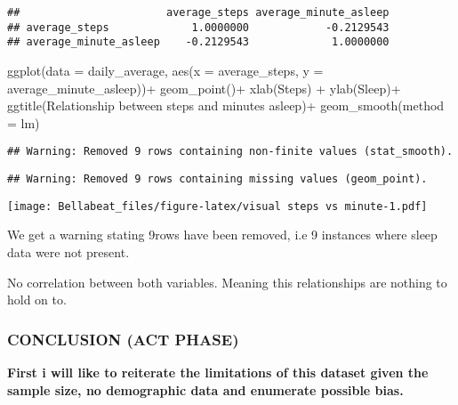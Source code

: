 \documentclass[
]{article}
\newenvironment{Shaded}{\begin{snugshade}}{\end{snugshade}}
\newcommand{\AttributeTok}[1]{\textcolor[rgb]{0.77,0.63,0.00}{#1}}
\newcommand{\FunctionTok}[1]{\textcolor[rgb]{0.00,0.00,0.00}{#1}}
\newcommand{\NormalTok}[1]{#1}
\newcommand{\SpecialCharTok}[1]{\textcolor[rgb]{0.00,0.00,0.00}{#1}}
\newcommand{\StringTok}[1]{\textcolor[rgb]{0.31,0.60,0.02}{#1}}
\begin{document}
\begin{verbatim}
##                       average_steps average_minute_asleep
## average_steps             1.0000000            -0.2129543
## average_minute_asleep    -0.2129543             1.0000000
\end{verbatim}

\begin{Shaded}
\begin{Highlighting}[]
\FunctionTok{ggplot}\NormalTok{(}\AttributeTok{data =}\NormalTok{ daily\_average, }\FunctionTok{aes}\NormalTok{(}\AttributeTok{x =}\NormalTok{ average\_steps, }\AttributeTok{y =}\NormalTok{ average\_minute\_asleep))}\SpecialCharTok{+}
  \FunctionTok{geom\_point}\NormalTok{()}\SpecialCharTok{+}
  \FunctionTok{xlab}\NormalTok{(}\StringTok{\textquotesingle{}Steps\textquotesingle{}}\NormalTok{) }\SpecialCharTok{+} \FunctionTok{ylab}\NormalTok{(}\StringTok{\textquotesingle{}Sleep\textquotesingle{}}\NormalTok{)}\SpecialCharTok{+}
  \FunctionTok{ggtitle}\NormalTok{(}\StringTok{\textquotesingle{}Relationship between steps and minutes asleep\textquotesingle{}}\NormalTok{)}\SpecialCharTok{+}
  \FunctionTok{geom\_smooth}\NormalTok{(}\AttributeTok{method =}\NormalTok{ lm)}
\end{Highlighting}
\end{Shaded}

\begin{verbatim}
## Warning: Removed 9 rows containing non-finite values (stat_smooth).
\end{verbatim}

\begin{verbatim}
## Warning: Removed 9 rows containing missing values (geom_point).
\end{verbatim}

\texttt{[image: Bellabeat\_files/figure-latex/visual steps vs minute-1.pdf]}

We get a warning stating 9rows have been removed, i.e 9 instances where
sleep data were not present.

No correlation between both variables. Meaning this relationships are
nothing to hold on to.

\hypertarget{conclusion-act-phase}{%
\subsubsection{CONCLUSION (ACT PHASE)}\label{conclusion-act-phase}}

\textbf{First i will like to reiterate the limitations of this dataset
given the sample size, no demographic data and enumerate possible bias.}
\end{document}
